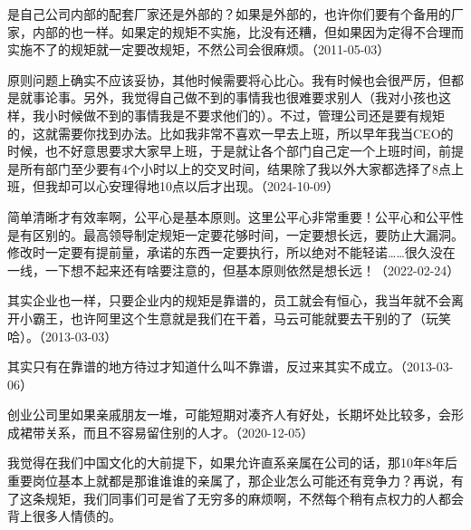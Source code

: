 是自己公司内部的配套厂家还是外部的？如果是外部的，也许你们要有个备用的厂家，内部的也一样。如果定的规矩不实施，比没有还糟，但如果因为定得不合理而实施不了的规矩就一定要改规矩，不然公司会很麻烦。（2011-05-03）


原则问题上确实不应该妥协，其他时候需要将心比心。我有时候也会很严厉，但都是就事论事。另外，我觉得自己做不到的事情我也很难要求别人（我对小孩也这样，我小时候做不到的事情我是不要求他们的）。不过，管理公司还是要有规矩的，这就需要你找到办法。比如我非常不喜欢一早去上班，所以早年我当CEO的时候，也不好意思要求大家早上班，于是就让各个部门自己定一个上班时间，前提是所有部门至少要有4个小时以上的交叉时间，结果除了我以外大家都选择了8点上班，但我却可以心安理得地10点以后才出现。（2024-10-09）


简单清晰才有效率啊，公平心是基本原则。这里公平心非常重要！公平心和公平性是有区别的。最高领导制定规矩一定要花够时间，一定要想长远，要防止大漏洞。修改时一定要有提前量，承诺的东西一定要执行，所以绝对不能轻诺……很久没在一线，一下想不起来还有啥要注意的，但基本原则依然是想长远！（2022-02-24）


其实企业也一样，只要企业内的规矩是靠谱的，员工就会有恒心，我当年就不会离开小霸王，也许阿里这个生意就是我们在干着，马云可能就要去干别的了（玩笑哈）。（2013-03-03）


其实只有在靠谱的地方待过才知道什么叫不靠谱，反过来其实不成立。（2013-03-06）


创业公司里如果亲戚朋友一堆，可能短期对凑齐人有好处，长期坏处比较多，会形成裙带关系，而且不容易留住别的人才。（2020-12-05）

我觉得在我们中国文化的大前提下，如果允许直系亲属在公司的话，那10年8年后重要岗位基本上就都是那谁谁谁的亲属了，那企业怎么可能还有竞争力？再说，有了这条规矩，我们同事们可是省了无穷多的麻烦啊，不然每个稍有点权力的人都会背上很多人情债的。

